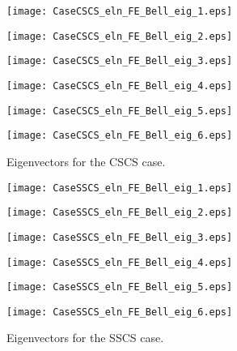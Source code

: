 \documentclass[11pt]{article}
\begin{document}
	
	\begin{figure}[p]%
		\texttt{[image: CaseCSCS\_eln\_FE\_Bell\_eig\_1.eps]}
		\caption*{$\widehat{\omega}_{1}$}\label{fig:CSCS1}%
		\endminipage
		\texttt{[image: CaseCSCS\_eln\_FE\_Bell\_eig\_2.eps]}
		\caption*{$\widehat{\omega}_{2}$}\label{fig:CSCS2}%
		\endminipage
		\texttt{[image: CaseCSCS\_eln\_FE\_Bell\_eig\_3.eps]}
		\caption*{$\widehat{\omega}_{3}$}\label{fig:CSCS3}%
		\endminipage
		\texttt{[image: CaseCSCS\_eln\_FE\_Bell\_eig\_4.eps]}
		\caption*{$\widehat{\omega}_{4}$}\label{fig:CSCS4}%
		\endminipage
		\texttt{[image: CaseCSCS\_eln\_FE\_Bell\_eig\_5.eps]}
		\caption*{$\widehat{\omega}_{5}$}\label{fig:CSCS5}%
		\endminipage
		\texttt{[image: CaseCSCS\_eln\_FE\_Bell\_eig\_6.eps]}
		\caption*{$\widehat{\omega}_{6}$}\label{fig:CSCS6}%
		\endminipage
		\caption[Eigenvectors for CSCS]{Eigenvectors for the CSCS case.}%
		\label{fig:CSCS}%
	\end{figure}
	\begin{figure}[p]%
		\texttt{[image: CaseSSCS\_eln\_FE\_Bell\_eig\_1.eps]}
		\caption*{$\widehat{\omega}_{1}$}\label{fig:SSCS1}%
		\endminipage
		\texttt{[image: CaseSSCS\_eln\_FE\_Bell\_eig\_2.eps]}
		\caption*{$\widehat{\omega}_{2}$}\label{fig:SSCS2}%
		\endminipage
		\texttt{[image: CaseSSCS\_eln\_FE\_Bell\_eig\_3.eps]}
		\caption*{$\widehat{\omega}_{3}$}\label{fig:SSCS3}%
		\endminipage
		\texttt{[image: CaseSSCS\_eln\_FE\_Bell\_eig\_4.eps]}
		\caption*{$\widehat{\omega}_{4}$}\label{fig:SSCS4}%
		\endminipage
		\texttt{[image: CaseSSCS\_eln\_FE\_Bell\_eig\_5.eps]}
		\caption*{$\widehat{\omega}_{5}$}\label{fig:SSCS5}%
		\endminipage
		\texttt{[image: CaseSSCS\_eln\_FE\_Bell\_eig\_6.eps]}
		\caption*{$\widehat{\omega}_{6}$}\label{fig:SSCS6}%
		\endminipage
		\caption[Eigenvectors for SSCS]{Eigenvectors for the SSCS case.}%
		\label{fig:SSCS}%
	\end{figure}
\end{document}
